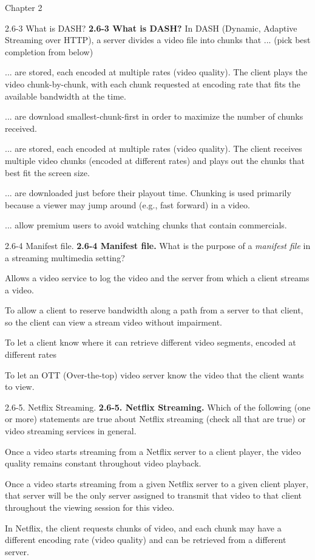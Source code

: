 \documentclass[11pt]{article}
\begin{document}
\begin{quiz}{Chapter 2}
\begin{multi}[points=1,shuffle]{2.6-3 What is DASH?}
\textbf{2.6-3 What is DASH?} 
In DASH (Dynamic, Adaptive Streaming over HTTP), a server divides a video file into chunks that ... (pick best completion from below)
\item* ... are stored, each encoded at multiple rates (video quality). The client plays the video chunk-by-chunk, with each chunk requested at encoding rate that fits the available bandwidth at the time.
\item ... are download smallest-chunk-first in order to maximize the number of chunks received.
\item ... are stored, each encoded at multiple rates (video quality). The client receives multiple video chunks (encoded at different rates) and plays out the chunks that best fit the screen size.
\item ... are downloaded just before their playout time. Chunking is used primarily because a viewer may jump around (e.g., fast forward) in a video.
\item ... allow premium users to avoid watching chunks that contain commercials.
\end{multi}

\begin{multi}[points=1,shuffle]{2.6-4 Manifest file.}
\textbf{2.6-4 Manifest file.} 
What is the purpose of a \emph{manifest file} in a streaming multimedia setting?
\item Allows a video service to log the video and the server from which a client streams a video.
\item To allow a client to reserve bandwidth along a path from a server to that client, so the client can view a stream video without impairment.
\item* To let a client know where it can retrieve different video segments, encoded at different rates
\item To let an OTT (Over-the-top) video server know the video that the client wants to view.
\end{multi}

\begin{multi}[points=1,shuffle,multiple]{2.6-5. Netflix Streaming.}
\textbf{2.6-5. Netflix Streaming.}  
Which of the following (one or more) statements are true about Netflix streaming (check all that are true) or video streaming services in general.
\item Once a video starts streaming from a Netflix server to a client player, the video quality remains constant throughout video playback.
\item Once a video starts streaming from a given Netflix server to a given client player, that server will be the only server assigned to transmit that video to that client throughout the viewing session for this video.
\item* In Netflix, the client requests chunks of video, and each chunk may have a different encoding rate (video quality) and can be retrieved from a different server.
\end{multi}


\end{quiz}
\end{document}
